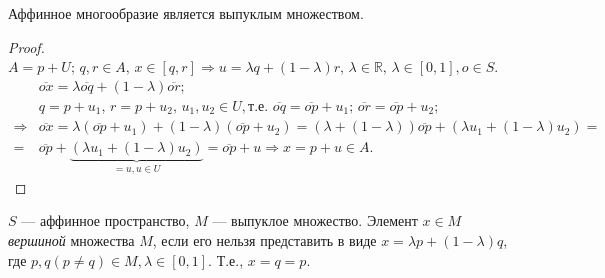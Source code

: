 \begin{utv}
	Аффинное многообразие является выпуклым множеством. 
\end{utv}
\begin{proof}
	$A = p + U; \, q, r \in A, \, x \in [q, r] \Rightarrow u = \lambda q + (1 - \lambda) r, \, \lambda \in \mathbb{R}, \, \lambda \in [0, 1], o \in S$.
	\begin{align*}
		&\overline{ox} = \lambda \overline{oq} + (1 - \lambda) \overline{or}; \\
		&q = p + u_1, \, r = p + u_2, \, u_1, u_2 \in U,\text{т.е. } \overline{oq} = \overline{op} + u_1; \, \overline{or} = \overline{op} + u_2; \\
		\Rightarrow &\overline{ox} = \lambda (\overline{op} + u_1) + (1 - \lambda) (\overline{op} + u_2) = (\lambda + (1 - \lambda)) \overline{op} + (\lambda u_1 + (1 - \lambda) u_2) = \\ = &\overline{op} + \underbrace{(\lambda u_1 + (1 - \lambda) u_2)}_{= u, u \in U} = \overline{op} + u \Rightarrow x = p + u \in A. 
	\end{align*}
\end{proof}

\begin{definition}
	$S$ --- аффинное пространство, $M$ --- выпуклое множество. Элемент $x \in M$ \textit{вершиной} множества $M$, если его нельзя представить в виде $x = \lambda p + (1 - \lambda) q$, где $p, q (p \not = q) \in M, \lambda \in [0, 1]$. Т.е., $x = q = p$. 
\end{definition}